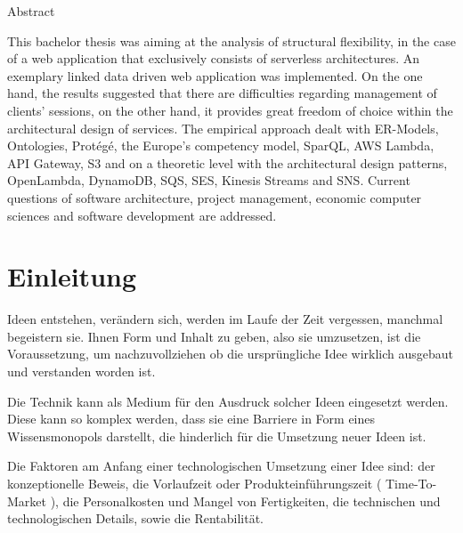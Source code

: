 \documentclass[
12pt,
english,
ngerman,
headsepline,
twoside,
openright,
numbers=noenddot,version=first
]{scrreprt}
\makeatletter
\renewenvironment{abstract}{
\@beginparpenalty\@lowpenalty
\begin{center}
\normalfont\sectfont\nobreak\abstractname
\end{center}
\@endparpenalty\@M
}{
\par
}
\makeatother
\begin{document}
\renewcommand{\abstractname}{Abstract}
\begin{abstract}

This bachelor thesis was aiming at the analysis of structural flexibility, in the case of a web application that exclusively consists of serverless architectures. An exemplary linked data driven web application was implemented. On the one hand, the results suggested that there are difficulties regarding management of clients' sessions, on the other hand, it provides great freedom of choice within the architectural design of services. The empirical approach dealt with ER-Models, Ontologies, Protégé, the Europe's competency model, SparQL, AWS Lambda, API Gateway, S3 and on a theoretic level with the architectural design patterns, OpenLambda, DynamoDB, SQS, SES, Kinesis Streams and SNS. Current questions of software architecture, project management, economic computer sciences and software development are addressed.
\end{abstract}


\chapter{Einleitung}
\setcounter{page}{1}
\label{chap:introduction}

Ideen entstehen, verändern sich, werden im Laufe der Zeit vergessen, manchmal begeistern sie. Ihnen Form und Inhalt zu geben, also sie umzusetzen, ist die Voraussetzung, um nachzuvollziehen ob die ursprüngliche Idee wirklich ausgebaut und verstanden worden ist.

Die Technik kann als Medium für den Ausdruck solcher Ideen eingesetzt werden. Diese kann so komplex werden, dass sie eine Barriere in Form eines Wissensmonopols darstellt, die hinderlich für die Umsetzung neuer Ideen ist.


Die Faktoren am Anfang einer technologischen Umsetzung einer Idee sind:\label{aspect}
der konzeptionelle Beweis, die Vorlaufzeit oder Produkteinführungszeit ( Time-To-Market ), die Personalkosten und Mangel von Fertigkeiten, die technischen und technologischen Details, sowie die Rentabilität.
\end{document}
